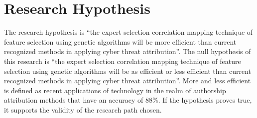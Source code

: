 \documentclass[12pt]{report}
\begin{document}

\section{Research Hypothesis} 
The research hypothesis is ``the expert selection correlation mapping technique of feature selection using genetic algorithms will be more efficient than current recognized methods in applying cyber threat attribution''. The null hypothesis of this research is ``the expert selection correlation mapping technique of feature selection using genetic algorithms will be as efficient or less efficient than current recognized methods in applying cyber threat attribution''.  More and less efficient is defined as recent applications of technology in the realm of authorship attribution methods that have an accuracy of 88\%.  If the hypothesis proves true, it supports the validity of the research path chosen.
\end{document}
